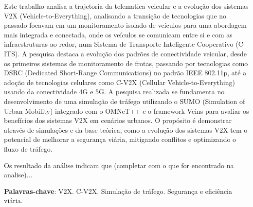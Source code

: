 \documentclass[
	12pt,				%
	openright,			%
	oneside,			%
	a4paper,			%
	english,			%
	french,				%
	spanish,			%
	brazil				%
	]{abntex2}
\begin{document}
\setlength{\absparsep}{18pt} %
\renewcommand{\baselinestretch}{1} 
\begin{resumo}

    Este trabalho analisa a trajetoria da telematica veicular e a evolução dos sistemas V2X (Vehicle-to-Everything), analisando a transição de tecnologias que
    no passado focavam em um monitoramento isolado de veículos para uma abordagem mais integrada e conectada, onde os veículos se comunicam entre si e com as
    infraestruturas ao redor, num Sistema de Transporte Inteligente Cooperativo (C-ITS). A pesquisa destaca a evolução dos padrões de conectividade veicular,
    desde os primeiros sistemas de monitoramento de frotas, passando por tecnologias como DSRC (Dedicated Short-Range Communications) no padrão IEEE 802.11p,
    até a adoção de tecnologias celulares como C-V2X (Cellular Vehicle-to-Everything) usando da conectividade 4G e 5G. A pesquisa realizada se fundamenta no
    desenvolvimento de uma simulação de tráfego utilizando o SUMO (Simulation of Urban Mobility) integrado com o OMNeT++ e o framework Veins para avaliar os
    benefícios dos sistemas V2X em cenários urbanos. O propósito é demonstrar através de simulações e da base teórica, como a evolução dos sistemas V2X tem o
    potencial de melhorar a segurança viária, mitigando conflitos e optimizando o fluxo de tráfego.
    
    Os resultado da análise indicam que (completar com o que for encontrado na analise)...



 
   \noindent 
    \textbf{Palavras-chave}: V2X. C-V2X. Simulação de tráfego. Segurança e eficiência viária.
\end{resumo}
\end{document}
